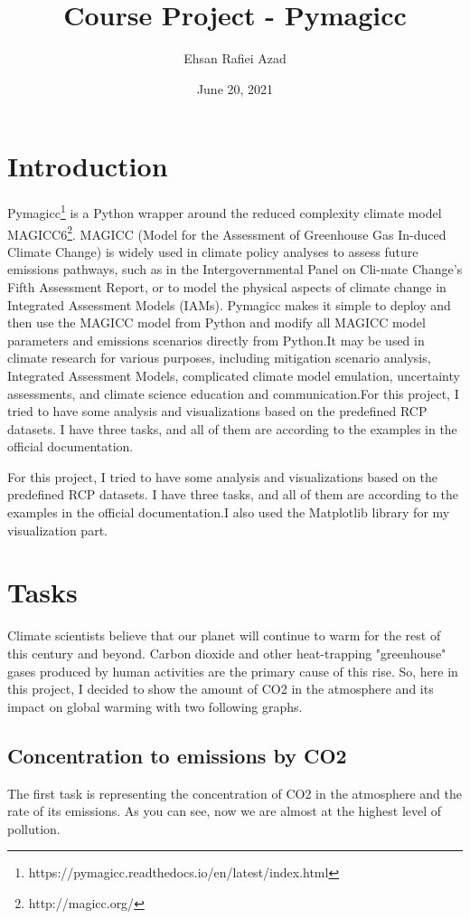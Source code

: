 \documentclass[12pt, letterpaper]{article}
\title{Course Project - Pymagicc}
\author{Ehsan Rafiei Azad}
\date{June 20, 2021}
\begin{document}
\maketitle

\section{Introduction}
Pymagicc\footnote{https://pymagicc.readthedocs.io/en/latest/index.html} is a Python wrapper around the reduced complexity climate model MAGICC6\footnote{http://magicc.org/}.  
 MAGICC  (Model  for  the  Assessment  of  Greenhouse  Gas  In-duced Climate Change) is widely used in climate policy analyses to assess future emissions pathways,  such as in the Intergovernmental Panel on Cli-mate Change’s Fifth Assessment Report, or to model the physical aspects of climate change in Integrated Assessment Models (IAMs).  Pymagicc makes it simple to deploy and then use the MAGICC model from Python and modify all MAGICC model parameters and emissions scenarios directly from Python.It may be used in climate research for various purposes, including mitigation scenario analysis, Integrated Assessment Models, complicated climate model emulation, uncertainty assessments, and climate science education and communication.For this project,  I tried to have some analysis and visualizations based on the predefined RCP datasets. I  have  three  tasks,  and  all  of  them  are according to the examples in the official documentation.
 
For this project,  I tried to have some analysis and visualizations based on the predefined  RCP  datasets.   I  have  three  tasks,  and  all  of  them  are according to the examples in the official documentation.I also used the Matplotlib library for my visualization part.

\section{Tasks}

Climate scientists\cite{o2017roads} believe that our planet will continue to warm for the rest of this century and beyond. Carbon dioxide and other heat-trapping "greenhouse" gases produced by human activities are the primary cause of this rise.
So, here in this project, I decided to show the amount of CO2 in the atmosphere and its impact on global warming with two following graphs.

\subsection{Concentration to emissions by CO2}
The first task is representing the concentration of CO2 in the atmosphere and the rate of its emissions. As you can see, now we are almost at the highest level of pollution.
\end{document}
